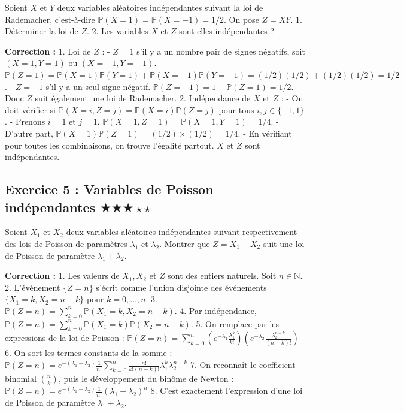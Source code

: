 \documentclass[11pt,a4paper]{article}
\begin{document}
Soient $X$ et $Y$ deux variables aléatoires indépendantes suivant la loi de Rademacher, c'est-à-dire $\mathbb{P}(X = 1) = \mathbb{P}(X = -1) = 1/2$. On pose $Z = XY$.
1. Déterminer la loi de $Z$.
2. Les variables $X$ et $Z$ sont-elles indépendantes ?

\textbf{Correction :}
1. Loi de $Z$ :
   - $Z = 1$ s'il y a un nombre pair de signes négatifs, soit $(X=1, Y=1)$ ou $(X=-1, Y=-1)$.
   - $\mathbb{P}(Z = 1) = \mathbb{P}(X=1)\mathbb{P}(Y=1) + \mathbb{P}(X=-1)\mathbb{P}(Y=-1) = (1/2)(1/2) + (1/2)(1/2) = 1/2$.
   - $Z = -1$ s'il y a un seul signe négatif. $\mathbb{P}(Z = -1) = 1 - \mathbb{P}(Z=1) = 1/2$.
   - Donc $Z$ suit également une loi de Rademacher.
2. Indépendance de $X$ et $Z$ :
   - On doit vérifier si $\mathbb{P}(X=i, Z=j) = \mathbb{P}(X=i)\mathbb{P}(Z=j)$ pour tous $i, j \in \{-1, 1\}$.
   - Prenons $i = 1$ et $j = 1$. $\mathbb{P}(X=1, Z=1) = \mathbb{P}(X=1, Y=1) = 1/4$.
   - D'autre part, $\mathbb{P}(X=1)\mathbb{P}(Z=1) = (1/2) \times (1/2) = 1/4$.
   - En vérifiant pour toutes les combinaisons, on trouve l'égalité partout. $X$ et $Z$ sont indépendantes.

\subsection*{Exercice 5 : Variables de Poisson indépendantes \quad $\bigstar\bigstar\bigstar\star\star$}

Soient $X_1$ et $X_2$ deux variables aléatoires indépendantes suivant respectivement des lois de Poisson de paramètres $\lambda_1$ et $\lambda_2$. Montrer que $Z = X_1 + X_2$ suit une loi de Poisson de paramètre $\lambda_1 + \lambda_2$.

\textbf{Correction :}
1. Les valeurs de $X_1, X_2$ et $Z$ sont des entiers naturels. Soit $n \in \mathbb{N}$.
2. L'événement $\{Z = n\}$ s'écrit comme l'union disjointe des événements $\{X_1 = k, X_2 = n-k\}$ pour $k = 0, \ldots, n$.
3. $\mathbb{P}(Z = n) = \sum_{k=0}^{n} \mathbb{P}(X_1 = k, X_2 = n-k)$.
4. Par indépendance, $\mathbb{P}(Z = n) = \sum_{k=0}^{n} \mathbb{P}(X_1 = k)\mathbb{P}(X_2 = n-k)$.
5. On remplace par les expressions de la loi de Poisson :
   $\mathbb{P}(Z = n) = \sum_{k=0}^{n} \left( e^{-\lambda_1} \frac{\lambda_1^k}{k!} \right) \left( e^{-\lambda_2} \frac{\lambda_2^{n-k}}{(n-k)!} \right)$
6. On sort les termes constants de la somme :
   $\mathbb{P}(Z = n) = e^{-(\lambda_1+\lambda_2)} \frac{1}{n!} \sum_{k=0}^{n} \frac{n!}{k!(n-k)!} \lambda_1^k \lambda_2^{n-k}$
7. On reconnaît le coefficient binomial $\binom{n}{k}$, puis le développement du binôme de Newton :
   $\mathbb{P}(Z = n) = e^{-(\lambda_1+\lambda_2)} \frac{1}{n!} (\lambda_1 + \lambda_2)^n$
8. C'est exactement l'expression d'une loi de Poisson de paramètre $\lambda_1 + \lambda_2$.
\end{document}
